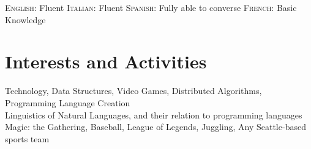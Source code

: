 \documentclass[letterpaper,10pt]{article} %
\begin{document}
\textsc{English:} Fluent \hfill \textsc{Italian:} Fluent \hfill 
\textsc{Spanish:} Fully able to converse \hfill \textsc{French:} Basic Knowledge




\section{Interests and Activities}

Technology, Data Structures, Video Games, Distributed Algorithms, Programming Language Creation \\
Linguistics of Natural Languages, and their relation to programming languages \\
Magic: the Gathering, Baseball, League of Legends, Juggling, Any Seattle-based sports team

\end{document}
